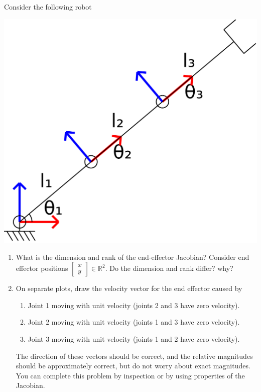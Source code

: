 \documentclass{16384_doc} %
\begin{document}
\begin{questions}
    Consider the following robot
    \begin{center}
    \includegraphics[scale=0.07]{generated_figures/RRR_singular.png}
    \end{center}
    \begin{enumerate} [label=\alph*.]
        \item \text{[1 point]} What is the dimension and rank of the end-effector Jacobian?
        Consider end effector positions $\begin{bmatrix} x \\ y \end{bmatrix} \in \mathbb{R}^2$.
        Do the dimension
        and rank differ? why?
        \begin{tcolorbox}[height=3cm]
        \end{tcolorbox}
        
        \item \text{[6 points]} On separate plots, draw the velocity vector for the end effector
        caused by
        \begin{enumerate} [label=(\roman*)]
          \item Joint 1 moving with unit velocity (joints 2 and 3 have zero velocity).
          \item Joint 2 moving with unit velocity (joints 1 and 3 have zero velocity).
          \item Joint 3 moving with unit velocity (joints 1 and 2 have zero velocity).
        \end{enumerate}
        The direction of these vectors should be correct, and the relative
        magnitudes should be approximately correct, but do not worry about
        exact magnitudes.  You can complete this problem by inspection or by
        using properties of the Jacobian.
        \begin{tcolorbox}[height=3cm]
        \end{tcolorbox}
        

\end{enumerate}
\end{questions}
\end{document}
